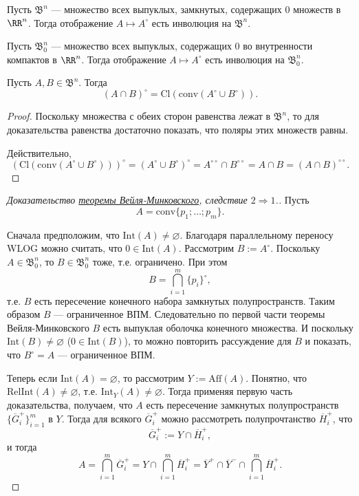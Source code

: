 \documentclass[12pt,a4paper]{article}
\newcommand{\Int}{\ensuremath{\mathrm{Int}}\xspace}
\newcommand{\Cl}{\ensuremath{\mathrm{Cl}}\xspace}
\newcommand{\Aff}{\ensuremath{\mathrm{Aff}}\xspace}
\newcommand{\conv}{\ensuremath{\mathrm{conv}}\xspace}
\newcommand{\RelInt}{\ensuremath{\mathrm{RelInt}}\xspace}
\begin{document}
    \begin{corollary}
        Пусть $\mathfrak{B}^n$ --- множество всех выпуклых, замкнутых, содержащих $0$ множеств в $\RR^n$. Тогда отображение $A \mapsto A^\circ$ есть инволюция на $\mathfrak{B}^n$.
    \end{corollary}

    \begin{corollary}
        Пусть $\mathfrak{B}_0^n$ --- множество всех выпуклых, содержащих $0$ во внутренности компактов в $\RR^n$. Тогда отображение $A \mapsto A^\circ$ есть инволюция на $\mathfrak{B}_0^n$.
    \end{corollary}

    \begin{corollary}
        Пусть $A, B \in \mathfrak{B}^n$. Тогда
        \[(A \cap B)^\circ = \Cl(\conv(A^\circ \cup B^\circ)).\]
    \end{corollary}

    \begin{proof}
        Поскольку множества с обеих сторон равенства лежат в $\mathfrak{B}^n$, то для доказательства равенства достаточно показать, что поляры этих множеств равны.

        Действительно,
        \[
            (\Cl(\conv(A^\circ \cup B^\circ)))^\circ
            = (A^\circ \cup B^\circ)^\circ
            = A^{\circ\circ} \cap B^{\circ\circ}
            = A \cap B
            = (A \cap B)^{\circ\circ}.
        \]
    \end{proof}

    \begin{proof}[Доказательство {\hyperref[Weyl-Minkowski-theorem]{теоремы Вейля-Минковского}}, следствие $2 \Rightarrow 1$.]
        Пусть
        \[A = \conv\{p_1; \dots; p_m\}.\]

        Сначала предположим, что $\Int(A) \neq \varnothing$. Благодаря параллельному переносу WLOG можно считать, что $0 \in \Int(A)$. Рассмотрим $B := A^\circ$. Поскольку $A \in \mathfrak{B}_0^n$, то $B \in \mathfrak{B}_0^n$ тоже, т.е. ограничено. При этом
        \[B = \bigcap_{i=1}^m \{p_i\}^\circ,\]
        т.е. $B$ есть пересечение конечного набора замкнутых полупространств. Таким образом $B$ --- ограниченное ВПМ. Следовательно по первой части теоремы Вейля-Минковского $B$ есть выпуклая оболочка конечного множества. И поскольку $\Int(B) \neq \varnothing$ ($0 \in \Int(B)$), то можно повторить рассуждение для $B$ и показать, что $B^\circ = A$ --- ограниченное ВПМ.

        Теперь если $\Int(A) = \varnothing$, то рассмотрим $Y := \Aff(A)$. Понятно, что $\RelInt(A) \neq \varnothing$, т.е. $\Int_Y(A) \neq \varnothing$. Тогда применяя первую часть доказательства, получаем, что $A$ есть пересечение замкнутых полупространств $\{\overline{G}^+_i\}_{i=1}^m$ в $Y$. Тогда для всякого $\overline{G}^+_i$ можно рассмотреть полупрочтанство $\overline{H}^+_i$, что
        \[\overline{G}^+_i := Y \cap \overline{H}^+_i,\]
        и тогда
        \[A = \bigcap_{i=1}^m \overline{G}^+_i = Y \cap \bigcap_{i=1}^m \overline{H}^+_i = \overline{Y}^+ \cap \overline{Y}^- \cap \bigcap_{i=1}^m \overline{H}^+_i.\]
    \end{proof}
\end{document}
